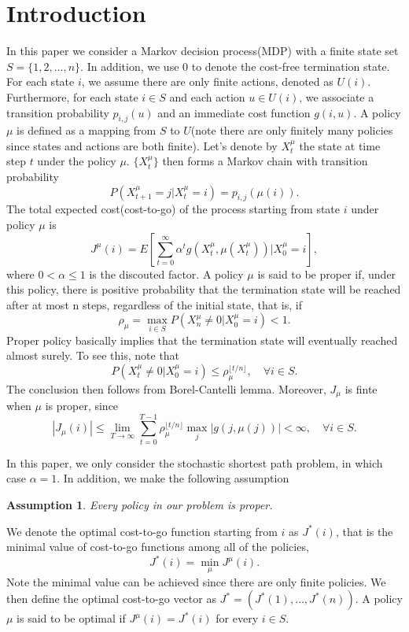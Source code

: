 \documentclass[12pt,a4paper]{amsart}
\numberwithin{equation}{section}
\theoremstyle{plain}
\newtheorem{Assump}[Th]{Assumption}
\theoremstyle{definition}
\begin{document}
\section{Introduction}
In this paper we consider a Markov decision process(MDP) with a finite state set $S = \{1, 2, \dots, n\}$.  In addition, we use 0 to denote the cost-free termination state. For each state $i$, we assume there are only finite actions, denoted as $U(i)$. Furthermore, for each state $i \in S$ and  each action $u \in U(i)$, we associate a transition probability $p_{i,j} (u)$ and an immediate cost function $g(i, u)$. A policy $\mu$ is defined as a mapping from $S$ to $U$(note there are only finitely many policies since states and actions are both finite). Let's denote by $X_t^{\mu}$ the state at time step $t$ under the policy $\mu$. $\{X_t^{\mu}\}$ then forms a Markov chain with transition probability
$$
P(X_{t+1}^{\mu} = j | X_t^{\mu} = i ) = p_{i,j} (\mu(i)). 
$$
The total expected cost(cost-to-go) of the process starting from state $i$ under policy $\mu$ is
$$
J^{\mu}(i) = E\left[ \sum_{t=0}^{\infty} \alpha^{t} g(X_t^{\mu}, \mu(X_t^{\mu}))  \big| X_0^{\mu} = i\right],
$$
where $0< \alpha \leq 1$ is the discouted factor.  A policy $\mu$ is said to be proper if, under this policy, there is positive probability that the termination state will be reached after at most n steps, regardless of the initial state, that is, if
$$
\rho_{\mu} = \max_{i \in S} P(X_n^{\mu} \ne 0 | X_0^{\mu} = i) < 1. 
$$
Proper policy basically implies that the termination state will eventually reached almost surely.  To see this, note that
$$
P(X_t^{\mu} \ne 0 | X_0^{\mu} = i) \le \rho_{\mu}^{ \lfloor t/n \rfloor}, \quad \forall i \in S.
$$
The conclusion then follows from Borel-Cantelli lemma. Moreover, $J_{\mu}$ is finte when $\mu$ is proper, since
$$
|J_{\mu}(i)| \le \lim_{T\to \infty} \sum_{t=0}^{T-1} \rho_{\mu}^{\lfloor t /n \rfloor} \max_{j} |g(j, \mu(j))| < \infty, \quad \forall i \in S.  
$$

In this paper, we only consider the stochastic shortest path problem, in which case $\alpha = 1$. In addition,  we make the following assumption
\begin{Assump} \label{assumption}
	Every policy in our problem is proper. 
\end{Assump}

We denote the optimal cost-to-go function  starting from $i$ as $J^{*}(i)$, that is the minimal value of cost-to-go functions among all of the policies, 
$$
J^{*}(i) = \min_{\mu} J^{\mu} (i).
$$
Note the minimal value can be achieved since there are only finite policies. We then define the optimal cost-to-go vector as $J^{*} = (J^{*}(1), \dots, J^{*}(n) ).$ A policy $\mu$ is said to be optimal if $J^{\mu}(i) = J^{*}(i)$ for every $i \in S$. 
\end{document}
